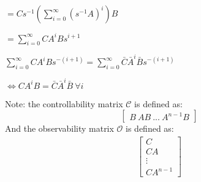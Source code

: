 \documentclass[a4paper, 11 pt]{article}
\begin{document}
$=Cs^{-1} \left( \sum_{i=0}^{\infty}(s^{-1}A)^{i}\right)B$

$=\sum_{i=0}^{\infty} CA^{i}Bs^{i+1}$


$\sum_{i=0}^{\infty} CA^{i}Bs^{-(i+1)} = \sum_{i=0}^{\infty} \bar{C}\bar{A}^{i}\bar{B}s^{-(i+1)}$

$\iff CA^{i}B = \bar{C}\bar{A}^{i}\bar{B} \ \forall i$


Note: the controllability matrix $\mathcal{C}$ is defined as:
\begin{equation}
  \begin{bmatrix}
      B \ AB \ ... \ A^{n-1}B
  \end{bmatrix}
\end{equation}
And the observability matrix $\mathcal{O}$ is defined as:
\begin{equation}
    \begin{align}
  \begin{bmatrix}
      C \\ CA \\ \vdots \\ CA^{n-1}
  \end{bmatrix}
    \end{align}
\end{equation}
\end{document}
